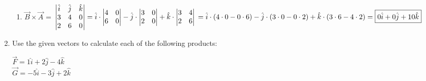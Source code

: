 \documentclass[letterpaper, 12pt]{article}
\begin{document}
\begin{enumerate}
\begin{enumerate}
		\item $\vec{B} \times \vec{A}$   \color {red} = $
		\begin{vmatrix}
		\hat{i} & \hat{j} & \hat{k}\\
		3 & 4 & 0 \\
		2 & 6 & 0 
		\end{vmatrix}  = 
		\hat{i} \cdot		\begin{vmatrix}
		4 & 0 \\
		6 & 0 
		\end{vmatrix}
		- \hat{j} \cdot \begin{vmatrix}
		3 & 0 \\
		2 & 0 
		\end{vmatrix}
		+ 	\hat{k} \cdot \begin{vmatrix}
		3 & 4 \\
		2 & 6 
		\end{vmatrix} \\= \hat{i} \cdot (4\cdot 0 - 0 \cdot 6) - \hat{j} \cdot (3 \cdot 0 - 0 \cdot 2) + \hat{k} \cdot (3 \cdot 6 - 4 \cdot 2) = \boxed{0 \hat{i} + 0 \hat{j} + 10 \hat{k}}
		$
		\vspace{0.15in}
	\end{enumerate}

	\item Use the given vectors to calculate each of the following products:
	\begin{center}
		$\vec{F} = 1 \hat{i} + 2 \hat{j} - 4 \hat{k} $ \\
		$\vec{G} = -5 \hat{i} - 3 \hat{j} + 2 \hat{k}$
	\end{center}
	

\end{enumerate}
\end{document}
